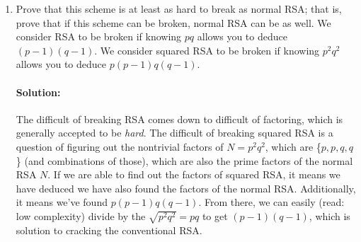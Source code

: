 \documentclass[11pt, notitlepage]{report}
\newenvironment{solution}{\paragraph{Solution:}}{\hfill}
\begin{document}
\begin{enumerate}[label=(\alph*)]
  \begin{solution}
  	To prove the statement, we have to prove: \begin{equation}\forall x\text{ relatively prime to $p$ and $q$}, (x^e)^d=x\pmod{N}\end{equation}
  \begin{proof}
  	Consider the exponent, $ed$. By the definition of $d$, we know that $ed= 1 \pmod{p(p-1)q(q-1)}$; hence we can write $ed= 1 + kp(p-1)q(q-1)$, therefore:
  	\begin{equation}x^{ed}-x=x^{1 + kp(p-1)q(q-1)}-x=x(x^{kp(p-1)q(q-1)}-1)\end{equation}
  	From (1), we want to show that this last expression is 0 mod N. We claim this is so because $x(x^{kp(p-1)q(q-1)}-1)$ is divisible by $p^2$. To show this, let us consider 2 cases:
  	\begin{enumerate}[label=\arabic*.)]
  	\item $x$ is not a multiple of $p^2$. In this case, since $x\not=0\pmod{p^2}$, we can use our results from (a) to deduce that $x^{kp(p-1)q(q-1)}-1=0 \pmod{p^2}$, as desired.
  	\item $x$ is a multiple of $p^2$. In this case, since $x\not=0\pmod{p^2}$ is a multiple of x, it is trivially divisible by $p^2$.
  	\end{enumerate}
  	By a symmetrical argument, the expression is also divisible by $q^2$, therefore it is divisible by both $p^2$ and $q^2$, and must also be divisible by their products, $p^2q^2=N$. This implies the final expression in (2) $=0\pmod{N}$, which was the necessary condition for our proof.
  \end{proof}
  \end{solution}
  
  \item Prove that this scheme is at least as hard to break as normal RSA; that is, prove that if this scheme can be broken, normal RSA can be as well. We consider RSA to be broken if knowing $pq$ allows you to deduce $(p - 1)(q - 1)$. We consider squared RSA to be broken if knowing $p^2q^2$ allows you to deduce $p(p - 1)q(q - 1)$.
 \begin{solution}
  	The difficult of breaking RSA comes down to difficult of factoring, which is generally accepted to be \textit{hard}. The difficult of breaking squared RSA is a question of figuring out the nontrivial factors of $N=p^2q^2$, which are \{$p,p,q,q$\} (and combinations of those), which are also the prime factors of the normal RSA $N$. If we are able to find out the factors of squared RSA, it means we have deduced we have also found the factors of the normal RSA. Additionally, it means we've found $p(p - 1)q(q - 1)$. From there, we can easily (read: low complexity) divide by the $\sqrt{p^2q^2}=pq$ to get $(p - 1)(q - 1)$, which is solution to cracking the conventional RSA. 
  \end{solution}
\end{enumerate}
\end{document}

